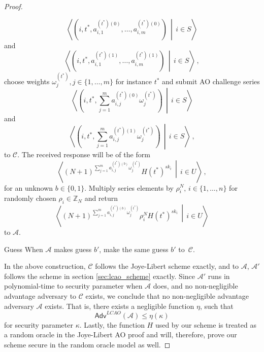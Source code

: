 \documentclass[10pt,letterpaper,oneside,twocolumn,journal]{IEEEtran}
\theoremstyle{definition}
\theoremstyle{definition}
\theoremstyle{remark}
\begin{document}
\begin{proof}
\begin{LaTeXdescription}
\begin{equation*}
            \left\langle\left(i,t^*,a^{(t^*)(0)}_{i,1},\dots,a^{(t^*)(0)}_{i,m}\right)\,\middle|\,i \in S\right\rangle
        \end{equation*}
        and
        \begin{equation*}
            \left\langle\left(i,t^*,a^{(t^*)(1)}_{i,1},\dots,a^{(t^*)(1)}_{i,m}\right)\,\middle|\, i \in S\right\rangle\,,
        \end{equation*}
        choose weights $\omega^{(t^*)}_j,j\in\{1,\dots,m\}$ for instance $t^*$ and submit AO challenge series
        \begin{equation*}
            \left\langle\left(i,t^*,\sum^m_{j=1}a^{(t^*)(0)}_{i,j}\omega^{(t^*)}_j\right)\,\middle|\,i \in S\right\rangle
        \end{equation*}
        and
        \begin{equation*}
            \left\langle\left(i,t^*,\sum^m_{j=1}a^{(t^*)(1)}_{i,j}\omega^{(t^*)}_j\right)\,\middle|\,i \in S\right\rangle\,,
        \end{equation*}
        to $\mathcal{C}$. The received response will be of the form 
        \begin{equation*}
            \left\langle(N+1)^{\sum^m_{j=1}a^{(t^*)(b)}_{i,j}\omega^{(t^*)}_j}H(t^*)^{sk_i}\,\middle|\,i\in U\right\rangle\,,
        \end{equation*}
        for an unknown $b \in \{0,1\}$. Multiply series elements by $\rho_i^N,\,i\in\{1,\dots,n\}$ for randomly chosen $\rho_i \in \mathbb{Z}_N$ and return
        \begin{equation*}
            \left\langle(N+1)^{\sum^m_{j=1}a^{(t^*)(b)}_{i,j}\omega^{(t^*)}_j}\rho_i^N H(t^*)^{sk_i}\,\middle|\,i\in U\right\rangle
        \end{equation*}
        to $\mathcal{A}$.
        \item[Guess] When $\mathcal{A}$ makes guess $b'$, make the same guess $b'$ to~$\mathcal{C}$.
    \end{LaTeXdescription}

    In the above construction, $\mathcal{C}$ follows the Joye-Libert scheme exactly, and to $\mathcal{A}$, $\mathcal{A}'$ follows the scheme in section \ref{sec:lcao_scheme} exactly. Since $\mathcal{A}'$ runs in polynomial-time to security parameter when $\mathcal{A}$ does, and no non-negligible advantage adversary to $\mathcal{C}$ exists, we conclude that no non-negligible advantage adversary $\mathcal{A}$ exists. That is, there exists a negligible function $\eta$, such that
    \begin{equation*}
        \mathsf{Adv}^{LCAO}(\mathcal{A}) \leq \eta(\kappa)
    \end{equation*}
    for security parameter $\kappa$. Lastly, the function $H$ used by our scheme is treated as a random oracle in the Joye-Libert AO proof and will, therefore, prove our scheme secure in the random oracle model as well.
\end{proof}
\end{document}

